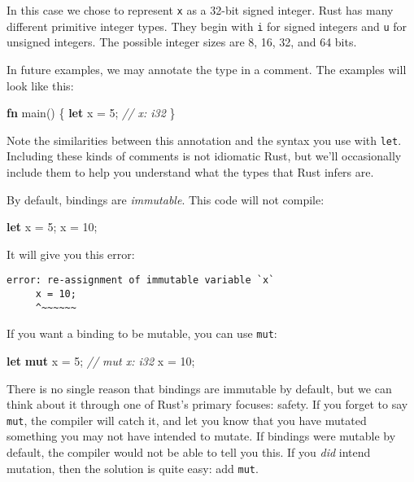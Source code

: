 \documentclass[a4paper,]{book}
\newenvironment{Shaded}{\begin{snugshade}}{\end{snugshade}}
\newcommand{\KeywordTok}[1]{\textcolor[rgb]{0.13,0.29,0.53}{\textbf{{#1}}}}
\newcommand{\DecValTok}[1]{\textcolor[rgb]{0.00,0.00,0.81}{{#1}}}
\newcommand{\CommentTok}[1]{\textcolor[rgb]{0.56,0.35,0.01}{\textit{{#1}}}}
\newcommand{\NormalTok}[1]{{#1}}
\begin{document}
In this case we chose to represent \texttt{x} as a 32-bit signed
integer. Rust has many different primitive integer types. They begin
with \texttt{i} for signed integers and \texttt{u} for unsigned
integers. The possible integer sizes are 8, 16, 32, and 64 bits.

In future examples, we may annotate the type in a comment. The examples
will look like this:

\begin{Shaded}
\begin{Highlighting}[]
\KeywordTok{fn} \NormalTok{main() \{}
    \KeywordTok{let} \NormalTok{x = }\DecValTok{5}\NormalTok{; }\CommentTok{// x: i32}
\NormalTok{\}}
\end{Highlighting}
\end{Shaded}

Note the similarities between this annotation and the syntax you use
with \texttt{let}. Including these kinds of comments is not idiomatic
Rust, but we'll occasionally include them to help you understand what
the types that Rust infers are.

By default, bindings are \emph{immutable}. This code will not compile:

\begin{Shaded}
\begin{Highlighting}[]
\KeywordTok{let} \NormalTok{x = }\DecValTok{5}\NormalTok{;}
\NormalTok{x = }\DecValTok{10}\NormalTok{;}
\end{Highlighting}
\end{Shaded}

It will give you this error:

\begin{verbatim}
error: re-assignment of immutable variable `x`
     x = 10;
     ^~~~~~~
\end{verbatim}

If you want a binding to be mutable, you can use \texttt{mut}:

\begin{Shaded}
\begin{Highlighting}[]
\KeywordTok{let} \KeywordTok{mut} \NormalTok{x = }\DecValTok{5}\NormalTok{; }\CommentTok{// mut x: i32}
\NormalTok{x = }\DecValTok{10}\NormalTok{;}
\end{Highlighting}
\end{Shaded}

There is no single reason that bindings are immutable by default, but we
can think about it through one of Rust's primary focuses: safety. If you
forget to say \texttt{mut}, the compiler will catch it, and let you know
that you have mutated something you may not have intended to mutate. If
bindings were mutable by default, the compiler would not be able to tell
you this. If you \emph{did} intend mutation, then the solution is quite
easy: add \texttt{mut}.
\end{document}
